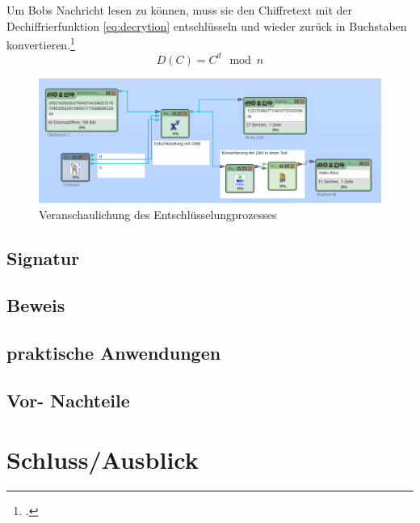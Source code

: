 \documentclass{scrarticle} %
\begin{document}
            Um Bobs Nachricht lesen zu können, muss sie den Chiffretext mit der Dechiffrierfunktion \ref{eq:decrytion} entschlüsseln und wieder zurück in Buchstaben konvertieren.\footcite[77]{ertel2003}
            \begin{equation}
                D(C) = C^{d}\mod{n} \label{eq:decrytion}
            \end{equation}
            \begin{figure}
                \includegraphics[width=\linewidth]{content/cryptool_decrypt_e1.png}
                \caption{Veranschaulichung des Entschlüsselungprozesses}
                \label{fig:decrypt}
            \end{figure}


    \subsection{Signatur}

    \subsection{Beweis}

    \subsection{praktische Anwendungen}

    \subsection{Vor-  Nachteile}

    \section{Schluss/Ausblick}

    \newpage
    \printbibliography
    \newpage
    
\end{document}
